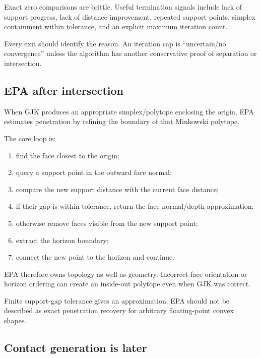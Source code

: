 \hypertarget{appendix-aef6177f7b3f-termination-and-finite-precision}{}

Exact zero comparisons are brittle. Useful termination signals include lack of support progress, lack of distance improvement, repeated support points, simplex containment within tolerance, and an explicit maximum iteration count.

Every exit should identify the reason. An iteration cap is ``uncertain/no convergence'' unless the algorithm has another conservative proof of separation or intersection.

\subsection{EPA after intersection}\label{appendix-aef6177f7b3f-epa-after-intersection}

\hypertarget{appendix-aef6177f7b3f-epa-after-intersection}{}

When GJK produces an appropriate simplex/polytope enclosing the origin, EPA estimates penetration by refining the boundary of that Minkowski polytope.

The core loop is:

\begin{enumerate}
\def\labelenumi{\arabic{enumi}.}
\tightlist
\item
  find the face closest to the origin;
\item
  query a support point in the outward face normal;
\item
  compare the new support distance with the current face distance;
\item
  if their gap is within tolerance, return the face normal/depth approximation;
\item
  otherwise remove faces visible from the new support point;
\item
  extract the horizon boundary;
\item
  connect the new point to the horizon and continue.
\end{enumerate}

EPA therefore owns topology as well as geometry. Incorrect face orientation or horizon ordering can create an inside-out polytope even when GJK was correct.

Finite support-gap tolerance gives an approximation. EPA should not be described as exact penetration recovery for arbitrary floating-point convex shapes.

\subsection{Contact generation is later}\label{appendix-aef6177f7b3f-contact-generation-is-later}

